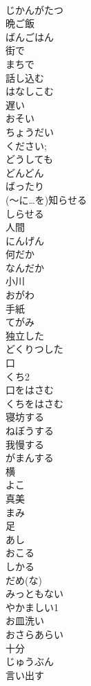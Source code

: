 \documentclass[8pt]{extreport}
\begin{document}
\begin{CJK}{UTF8}{min}
\\	じかんがたつ
\\	晩ご飯	
\\	ばんごはん
\\	街で	
\\	まちで
\\	話し込む	
\\	はなしこむ
\\	遅い	
\\	おそい
\\	ちょうだい	
\\	ください; 
\\	どうしても	
\\	どんどん	
\\	ばったり	
\\	(～に…を)知らせる	
\\	しらせる
\\	人間	
\\	にんげん
\\	何だか	
\\	なんだか
\\	小川	
\\	おがわ
\\	手紙	
\\	てがみ
\\	独立した	
\\	どくりつした
\\	口	
\\	くち2
\\	口をはさむ	
\\	くちをはさむ
\\	寝坊する	
\\	ねぼうする
\\	我慢する	
\\	がまんする
\\	横	
\\	よこ
\\	真美	
\\	まみ
\\	足	
\\	あし
\\	おこる	
\\	しかる	
\\	だめ(な)	
\\	みっともない	
\\	やかましい1	
\\	お皿洗い	
\\	おさらあらい
\\	十分	
\\	じゅうぶん
\\	言い出す	

\end{CJK}
\end{document}
